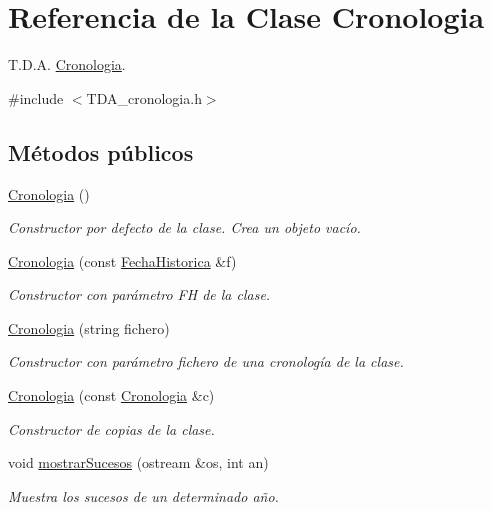 \hypertarget{classCronologia}{}\section{Referencia de la Clase Cronologia}
\label{classCronologia}


T.\+D.\+A. \hyperlink{classCronologia}{Cronologia}.  




{\ttfamily \#include $<$T\+D\+A\+\_\+cronologia.\+h$>$}

\subsection*{Métodos públicos}
\begin{DoxyCompactItemize}
\item 
\hyperlink{classCronologia_ac0026b1919148f6cd6cf4ca4c357771e}{Cronologia} ()
\begin{DoxyCompactList}\small\item\em Constructor por defecto de la clase. Crea un objeto vacío. \end{DoxyCompactList}\item 
\hyperlink{classCronologia_ada45af8cc8b3889186d0cd1da4a8d865}{Cronologia} (const \hyperlink{classFechaHistorica}{Fecha\+Historica} \&f)
\begin{DoxyCompactList}\small\item\em Constructor con parámetro FH de la clase. \end{DoxyCompactList}\item 
\hyperlink{classCronologia_a07d15a509e8f1681928547c297f9493e}{Cronologia} (string fichero)
\begin{DoxyCompactList}\small\item\em Constructor con parámetro fichero de una cronología de la clase. \end{DoxyCompactList}\item 
\hyperlink{classCronologia_a35694d459c7f2bc902b8db6abf13662d}{Cronologia} (const \hyperlink{classCronologia}{Cronologia} \&c)
\begin{DoxyCompactList}\small\item\em Constructor de copias de la clase. \end{DoxyCompactList}\item 
void \hyperlink{classCronologia_a69389997122f22203effd89e80785432}{mostrar\+Sucesos} (ostream \&os, int an)
\begin{DoxyCompactList}\small\item\em Muestra los sucesos de un determinado año. \end{DoxyCompactList}\item 

\end{DoxyCompactItemize}
